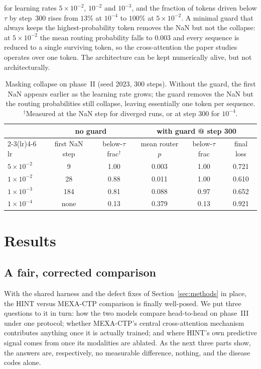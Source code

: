 \documentclass[a4paper,fleqn]{cas-sc}
\begin{document}
for learning rates $5\times10^{-2}$, $10^{-2}$ and $10^{-3}$, and the fraction of tokens
driven below $\tau$ by step~$300$ rises from $13\%$ at $10^{-4}$ to $100\%$ at
$5\times10^{-2}$. A minimal guard that always keeps the highest-probability token removes
the NaN but not the collapse: at $5\times10^{-2}$ the mean routing probability falls to
$0.003$ and every sequence is reduced to a single surviving token, so the cross-attention
the paper studies operates over one token. The architecture can be kept numerically alive,
but not architecturally.
\begin{table}[t]
\centering\small
\caption{Masking collapse on phase~II (seed 2023, 300 steps). Without the guard, the
first NaN appears earlier as the learning rate grows; the guard removes the NaN but the
routing probabilities still collapse, leaving essentially one token per sequence.
$^\dagger$Measured at the NaN step for diverged runs, or at step 300 for $10^{-4}$.}
\label{tab:collapse}
\begin{tabular}{lccccc}
\toprule
& \multicolumn{2}{c}{no guard} & \multicolumn{3}{c}{with guard @ step 300} \\
\cmidrule(lr){2-3}\cmidrule(lr){4-6}
lr & first NaN step & below-$\tau$ frac$^\dagger$ & mean router $p$ & below-$\tau$ frac & final loss \\
\midrule
$5\times10^{-2}$ & 9   & 1.00 & 0.003 & 1.00 & 0.721 \\
$1\times10^{-2}$ & 28  & 0.88 & 0.011 & 1.00 & 0.610 \\
$1\times10^{-3}$ & 184 & 0.81 & 0.088 & 0.97 & 0.652 \\
$1\times10^{-4}$ & none & 0.13 & 0.379 & 0.13 & 0.921 \\
\bottomrule
\end{tabular}
\end{table}
\section{Results}
\label{sec:results}
\subsection{A fair, corrected comparison}
With the shared harness and the defect fixes of Section~\ref{sec:methods} in place, the HINT
versus MEXA-CTP comparison is finally well-posed. We put three questions to it in turn: how the
two models compare head-to-head on phase~III under one protocol; whether MEXA-CTP's central
cross-attention mechanism contributes anything once it is actually trained; and where HINT's own
predictive signal comes from once its modalities are ablated. As the next three parts show, the
answers are, respectively, no measurable difference, nothing, and the disease codes alone.
\end{document}

